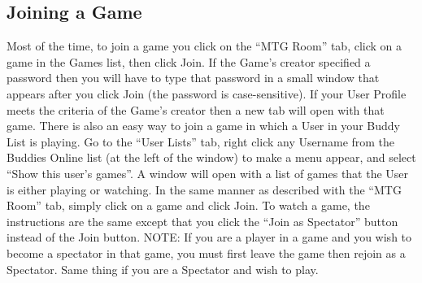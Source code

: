 \documentclass[a4paper]{scrbook}
\begin{document}
\subsection{Joining a Game}
Most of the time, to join a game you click on the “MTG Room” tab, click on a game in the Games list, then click Join.
If the Game's creator specified a password then you will have to type that password in a small window that appears after you click Join (the password is case-sensitive).
If your User Profile meets the criteria of the Game's creator then a new tab will open with that game.
There is also an easy way to join a game in which a User in your Buddy List is playing.
Go to the “User Lists” tab, right click any Username from the Buddies Online list (at the left of the window) to make a menu appear, and select “Show this user's games”.
A window will open with a list of games that the User is either playing or watching. In the same manner as described with the “MTG Room” tab, simply click on a game and click Join.
To watch a game, the instructions are the same except that you click the “Join as Spectator” button instead of the Join button.
NOTE: If you are a player in a game and you wish to become a spectator in that game, you must first leave the game then rejoin as a Spectator. Same thing if you are a Spectator and wish to play.
\end{document}
